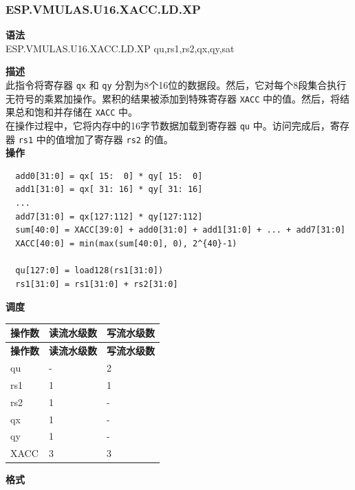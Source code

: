 \newpage

\newpage
\subsubsection{ESP.VMULAS.U16.XACC.LD.XP}\label{instruction:ESPVMULASU16XACCLDXP}
\textbf{语法}\\
ESP.VMULAS.U16.XACC.LD.XP qu,rs1,rs2,qx,qy,sat

\textbf{描述}\\
此指令将寄存器 \lstinline{qx} 和 \lstinline{qy} 分割为8个16位的数据段。然后，它对每个8段集合执行无符号的乘累加操作。累积的结果被添加到特殊寄存器 \lstinline{XACC} 中的值。然后，将结果总和饱和并存储在 \lstinline{XACC} 中。\\ 在操作过程中，它将内存中的16字节数据加载到寄存器 \lstinline{qu} 中。访问完成后，寄存器 \lstinline{rs1} 中的值增加了寄存器 \lstinline{rs2} 的值。\\

\textbf{操作}
\begin{lstlisting}
  add0[31:0] = qx[ 15:  0] * qy[ 15:  0]
  add1[31:0] = qx[ 31: 16] * qy[ 31: 16]
  ...
  add7[31:0] = qx[127:112] * qy[127:112]
  sum[40:0] = XACC[39:0] + add0[31:0] + add1[31:0] + ... + add7[31:0]
  XACC[40:0] = min(max(sum[40:0], 0), 2^{40}-1)

  qu[127:0] = load128(rs1[31:0])
  rs1[31:0] = rs1[31:0] + rs2[31:0]
\end{lstlisting}

\textbf{调度}\\
\begin{longtable}[c]{|l|l|l|}
    \hline
    \rowcolor{lightgray}
    \textbf{操作数} & \textbf{读流水级数} & \textbf{写流水级数} \\\hline
    \endfirsthead
    \hline
    \rowcolor{lightgray}
     \textbf{操作数} & \textbf{读流水级数} & \textbf{写流水级数} \\\hline
    \endhead
    \hline
    \endfoot

    qu & - & 2 \\\hline
    rs1 & 1 & 1 \\\hline
    rs2 & 1 & - \\\hline
     qx & 1 & - \\\hline
     qy & 1 & - \\\hline
     XACC & 3 & 3

\end{longtable}

\textbf{格式}\\


